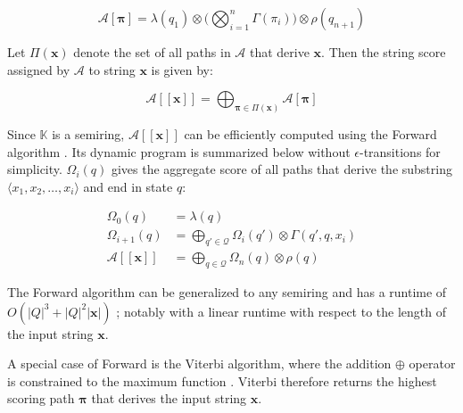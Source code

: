 \begin{equation}
  \mathcal{A}[\pmb{\pi}] = \lambda(q_1) \otimes \Bigg( \bigotimes_{i=1}^n \Gamma(\pi_i) \Bigg) \otimes \rho(q_{n+1})
\end{equation}

\begin{definition}
  \label{def:string-score}
  Let $\Pi(\pmb{x})$ denote the set of all paths in $\mathcal{A}$ that derive
  $\pmb{x}$. Then the string score assigned by $\mathcal{A}$ to string $\pmb{x}$
  is given by:
  
\end{definition}

\begin{equation}
  \mathcal{A}[\![\pmb{x}]\!] = \bigoplus_{\pmb{\pi} \in \Pi(\pmb{x})} \mathcal{A}[\pmb{\pi}]
\end{equation}

\begin{remark}
  Since $\mathbb{K}$ is a semiring, $\mathcal{A}[\![\pmb{x}]\!]$ can be
  efficiently computed using the Forward algorithm \citep{baum1966statistical}.
  Its dynamic program is summarized below without $\epsilon$-transitions for
  simplicity. $\Omega_i(q)$ gives the aggregate score of all paths that derive
  the substring $\langle x_1, x_2, \dots, x_i \rangle$ and end in state $q$:
 
  \begin{subequations}
    \begin{align}
      \Omega_0(q) &= \lambda(q) \\
      \Omega_{i+1}(q) &= \bigoplus_{q' \in \mathcal{Q}} \Omega_i(q') \otimes \Gamma(q',q,x_i)  \\
      \mathcal{A}[\![\pmb{x}]\!] &= \bigoplus_{q \in \mathcal{Q}} \Omega_n(q) \otimes \rho(q)
    \end{align}
  \end{subequations}

\end{remark}

\begin{remark}
  \label{rmk:old-runtime}
  The Forward algorithm can be generalized to any semiring
  \citep{eisner2002parameter} and has a runtime of $O(|Q|^3 + |Q|^2|\pmb{x}|)$
  \citep{schwartz2018sopa}; notably with a linear runtime with respect to the
  length of the input string $\pmb{x}$.
\end{remark}

\begin{remark}
  A special case of Forward is the Viterbi algorithm, where the addition
  $\oplus$ operator is constrained to the maximum function
  \citep{viterbi1967error}. Viterbi therefore returns the highest scoring path
  $\pmb{\pi}$ that derives the input string $\pmb{x}$.
\end{remark}

